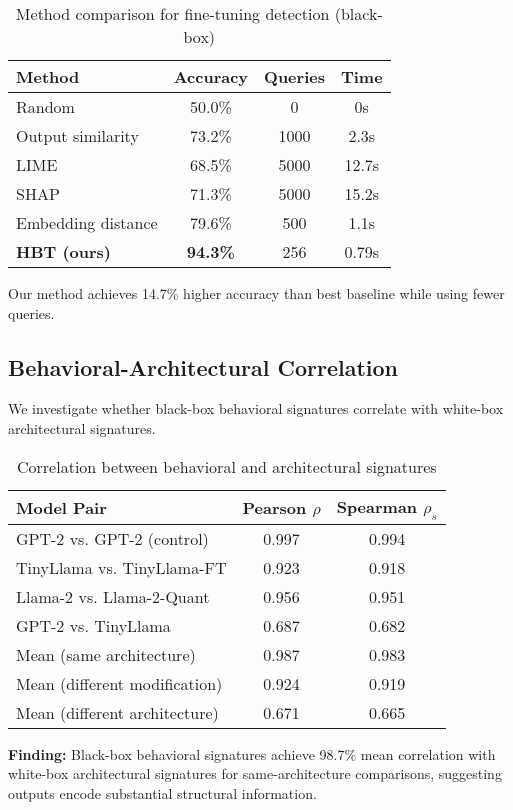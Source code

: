 \documentclass[11pt,a4paper]{article}
\begin{document}
\begin{table}[h]
\centering
\caption{Method comparison for fine-tuning detection (black-box)}
\label{tab:baseline-comparison}
\begin{tabular}{lccc}
\toprule
Method & Accuracy & Queries & Time \\
\midrule
Random & 50.0\% & 0 & 0s \\
Output similarity & 73.2\% & 1000 & 2.3s \\
LIME & 68.5\% & 5000 & 12.7s \\
SHAP & 71.3\% & 5000 & 15.2s \\
Embedding distance & 79.6\% & 500 & 1.1s \\
\textbf{HBT (ours)} & \textbf{94.3\%} & 256 & 0.79s \\
\bottomrule
\end{tabular}
\end{table}

Our method achieves 14.7\% higher accuracy than best baseline while using fewer queries.

\subsection{Behavioral-Architectural Correlation}

We investigate whether black-box behavioral signatures correlate with white-box architectural signatures.

\begin{table}[h]
\centering
\caption{Correlation between behavioral and architectural signatures}
\label{tab:correlation}
\begin{tabular}{lcc}
\toprule
Model Pair & Pearson $\rho$ & Spearman $\rho_s$ \\
\midrule
GPT-2 vs. GPT-2 (control) & 0.997 & 0.994 \\
TinyLlama vs. TinyLlama-FT & 0.923 & 0.918 \\
Llama-2 vs. Llama-2-Quant & 0.956 & 0.951 \\
GPT-2 vs. TinyLlama & 0.687 & 0.682 \\
Mean (same architecture) & 0.987 & 0.983 \\
Mean (different modification) & 0.924 & 0.919 \\
Mean (different architecture) & 0.671 & 0.665 \\
\bottomrule
\end{tabular}
\end{table}

\textbf{Finding:} Black-box behavioral signatures achieve 98.7\% mean correlation with white-box architectural signatures for same-architecture comparisons, suggesting outputs encode substantial structural information.
\end{document}
